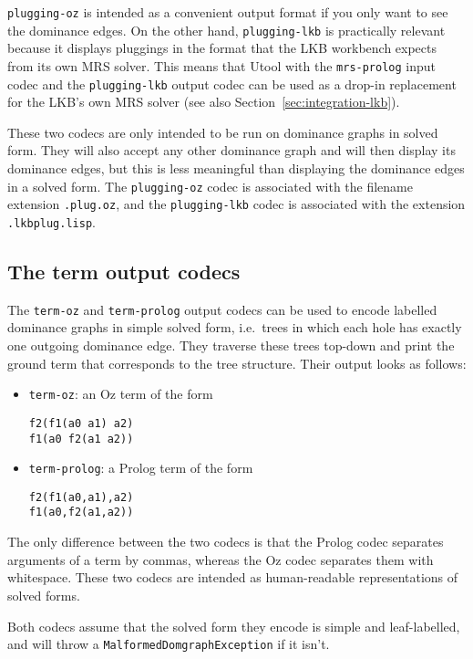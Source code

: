 \verb?plugging-oz? is intended as a convenient output format if you
only want to see the dominance edges. On the other hand,
\verb?plugging-lkb? is practically relevant because it displays
pluggings in the format that the LKB workbench expects from its own
MRS solver. This means that Utool with the \verb?mrs-prolog? input
codec and the \verb?plugging-lkb? output codec can be used as a
drop-in replacement for the LKB's own MRS solver (see also
Section~\ref{sec:integration-lkb}).

These two codecs are only intended to be run on dominance graphs in
solved form. They will also accept any other dominance graph and will
then display its dominance edges, but this is less meaningful than
displaying the dominance edges in a solved form. The
\verb?plugging-oz? codec is associated with the filename extension
\verb?.plug.oz?, and the \verb?plugging-lkb? codec is associated with
the extension \verb?.lkbplug.lisp?.



\subsection{The term output codecs}

The \verb?term-oz? and \verb?term-prolog? output codecs can be used to
encode labelled dominance graphs in simple solved form, i.e.\ trees in
which each hole has exactly one outgoing dominance edge. They traverse
these trees top-down and print the ground term that corresponds to the
tree structure. Their output looks as follows:
\begin{itemize}
\item \verb?term-oz?: an Oz term of the form
\begin{verbatim}
f2(f1(a0 a1) a2)
f1(a0 f2(a1 a2))
\end{verbatim}
\item \verb?term-prolog?:  a Prolog term of the form
\begin{verbatim}
f2(f1(a0,a1),a2)
f1(a0,f2(a1,a2))
\end{verbatim}
\end{itemize}

The only difference between the two codecs is that the Prolog codec
separates arguments of a term by commas, whereas the Oz codec
separates them with whitespace. These two codecs are intended as
human-readable representations of solved forms.

Both codecs assume that the solved form they encode is simple and
leaf-labelled, and will throw a \verb?MalformedDomgraphException? if
it isn't.


